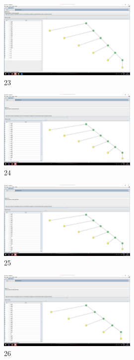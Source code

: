 \documentclass[a4paper,12pt]{article}
\begin{document}
    \begin{figure}[H]
        \centering
        \includegraphics[width=0.6\textwidth]{Aula03/Abigail/23.png}
        \caption*{23}
    \end{figure}
    \begin{figure}[H]
        \centering
        \includegraphics[width=0.6\textwidth]{Aula03/Abigail/24.png}
        \caption*{24}
    \end{figure}
    \begin{figure}[H]
        \centering
        \includegraphics[width=0.6\textwidth]{Aula03/Abigail/25.png}
        \caption*{25}
    \end{figure}
    \begin{figure}[H]
        \centering
        \includegraphics[width=0.6\textwidth]{Aula03/Abigail/26.png}
        \caption*{26}
    \end{figure}
\end{document}
